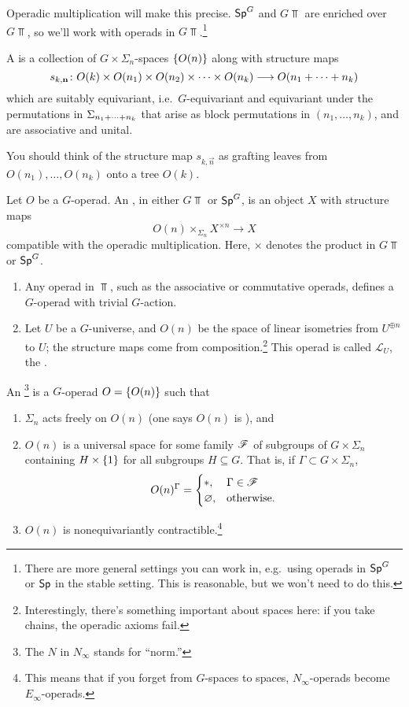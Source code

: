 Operadic multiplication will make this precise. $\mathsf{Sp}^G$ and $G\Top$ are enriched over $G\Top$, so we'll work with
operads in $G\Top$.\footnote{There are more general settings you can work in, e.g.\ using operads in $\mathsf{Sp}^G$ or
$\mathsf{Sp}$ in the stable setting. This is reasonable, but we won't need to do this.}
\begin{defn}
A  is a collection of $G\times\Sigma_n$-spaces $\{O(n)\}$ along with structure maps
\[s_{k,\boldsymbol{\mathbf{n}}}\colon O(k)\times O(n_1)\times O(n_2)\times \dotsb \times O(n_k)\longrightarrow O(n_1+ \dotsb + n_k)\]
which are suitably equivariant, i.e.\ $G$-equivariant and equivariant under the permutations in $\Sigma_{n_1+ \dotsb +
n_k}$ that arise as block permutations in $(n_1,\dotsc,n_k)$, and are associative and unital.
\end{defn}
You should think of the structure map $s_{k,\vec n}$ as grafting leaves from $O(n_1),\dotsc,O(n_k)$ onto a tree
$O(k)$.
\begin{defn}
Let $O$ be a $G$-operad. An , in either $G\Top$ or $\mathsf{Sp}^G$, is an object $X$ with structure maps
\[O(n)\times_{\Sigma_n} X^{\times n}\longrightarrow X\]
compatible with the operadic multiplication. Here, $\times$ denotes the product in $G\Top$ or $\mathsf{Sp}^G$.
\end{defn}
\begin{exm}\hfill
\label{Gopexm}
\begin{enumerate}
	\item Any operad in $\Top$, such as the associative or commutative operads, defines a $G$-operad with trivial
	$G$-action.
	\item Let $U$ be a $G$-universe, and $O(n)$ be the space of linear isometries from $U^{\oplus n}$ to $U$; the
	structure maps come from composition.\footnote{Interestingly, there's something important about spaces here: if
	you take chains, the operadic axioms fail.} This operad is called $\mathcal L_U$, the .
	\qedhere
\end{enumerate}
\end{exm}
\begin{defn}
An \footnote{The $N$ in $N_{\infty}$ stands for ``norm.''} is a $G$-operad $O = \{O(n)\}$
such that
\begin{enumerate}
	\item $\Sigma_n$ acts freely on $O(n)$ (one says $O(n)$ is ), and
	\item $O(n)$ is a universal space for some family $\mathscr F$ of subgroups of $G\times\Sigma_n$ containing $H\times\{1\}$
	for all subgroups $H\subseteq G$. That is, if $\Gamma\subset G\times\Sigma_n$,
	\[O(n)^\Gamma = \begin{cases}
		*, &\Gamma\in\mathscr F\\
		\varnothing, &\text{otherwise.}
	\end{cases}\]
	\item $O(n)$ is nonequivariantly contractible.\footnote{This means that if you forget from $G$-spaces to
	spaces, $N_\infty$-operads become $E_\infty$-operads.}
\end{enumerate}
\end{defn}
